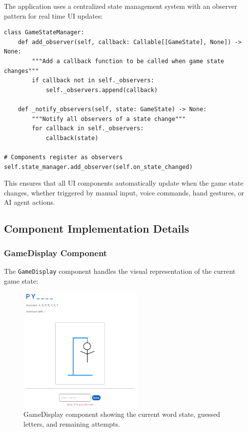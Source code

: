 The application uses a centralized state management system with an observer pattern for real time UI updates:

\begin{lstlisting}[style=pystyle, caption={Observer Pattern Implementation}]
class GameStateManager:
    def add_observer(self, callback: Callable[[GameState], None]) -> None:
        """Add a callback function to be called when game state changes"""
        if callback not in self._observers:
            self._observers.append(callback)
    
    def _notify_observers(self, state: GameState) -> None:
        """Notify all observers of a state change"""
        for callback in self._observers:
            callback(state)

# Components register as observers
self.state_manager.add_observer(self.on_state_changed)
\end{lstlisting}

This ensures that all UI components automatically update when the game state changes, whether triggered by manual input, voice commands, hand gestures, or AI agent actions.

\newpage
\subsection*{Component Implementation Details}
\subsubsection*{GameDisplay Component}
The \texttt{GameDisplay} component handles the visual representation of the current game state:

\begin{figure}
    \centering
    \includegraphics[width=0.55\textwidth]{./images/hang-man.png}
    \caption{GameDisplay component showing the current word state, guessed letters, and remaining attempts.}
\end{figure}

